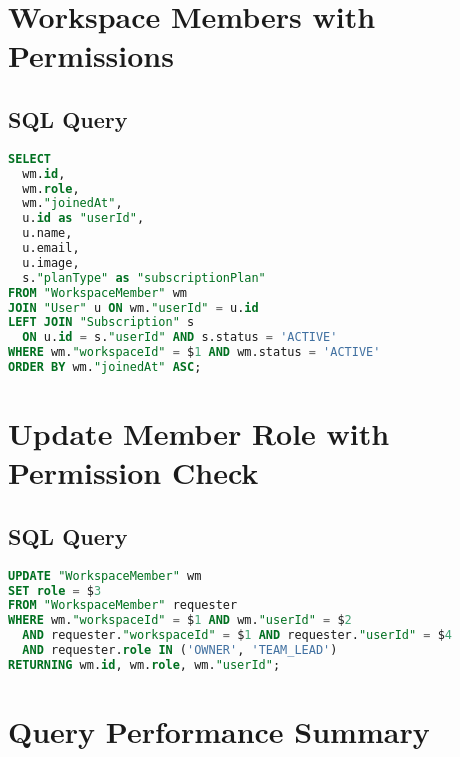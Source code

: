 \section{Workspace Members with Permissions}
\label{sec:query-workspace-members}

\subsection{SQL Query}
\begin{lstlisting}[language=SQL, caption={Workspace Members Query}]
SELECT 
  wm.id, 
  wm.role, 
  wm."joinedAt",
  u.id as "userId", 
  u.name, 
  u.email, 
  u.image,
  s."planType" as "subscriptionPlan"
FROM "WorkspaceMember" wm
JOIN "User" u ON wm."userId" = u.id
LEFT JOIN "Subscription" s 
  ON u.id = s."userId" AND s.status = 'ACTIVE'
WHERE wm."workspaceId" = $1 AND wm.status = 'ACTIVE'
ORDER BY wm."joinedAt" ASC;
\end{lstlisting}

\section{Update Member Role with Permission Check}
\label{sec:query-update-role}

\subsection{SQL Query}
\begin{lstlisting}[language=SQL, caption={Update Role with Authorization}]
UPDATE "WorkspaceMember" wm
SET role = $3
FROM "WorkspaceMember" requester
WHERE wm."workspaceId" = $1 AND wm."userId" = $2
  AND requester."workspaceId" = $1 AND requester."userId" = $4
  AND requester.role IN ('OWNER', 'TEAM_LEAD')
RETURNING wm.id, wm.role, wm."userId";
\end{lstlisting}

\section{Query Performance Summary}
\label{sec:query-summary}

